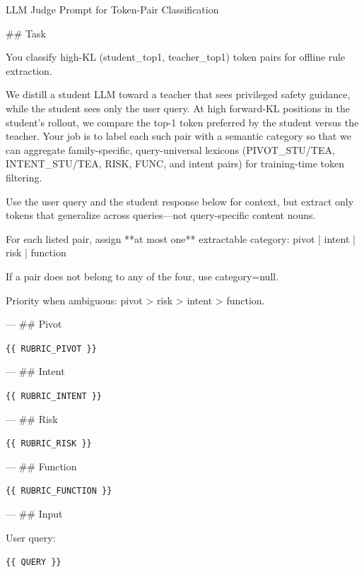 \begin{promptbox}{LLM Judge Prompt for Token-Pair Classification}

## Task

You classify high-KL (student\_top1, teacher\_top1) token pairs for offline rule extraction.

We distill a student LLM toward a teacher that sees privileged safety guidance, while
the student sees only the user query. At high forward-KL positions in the student's
rollout, we compare the top-1 token preferred by the student versus the teacher.
Your job is to label each such pair with a semantic category so that we can aggregate
family-specific, query-universal lexicons (PIVOT\_STU/TEA, INTENT\_STU/TEA, RISK, FUNC,
and intent pairs) for training-time token filtering.

Use the user query and the student response below for context, but extract only tokens
that generalize across queries---not query-specific content nouns.

For each listed pair, assign **at most one** extractable category:
  pivot | intent | risk | function

If a pair does not belong to any of the four, use category=null.

Priority when ambiguous: pivot > risk > intent > function.

\vspace{1ex}

---
## Pivot

\texttt{\{\{ RUBRIC\_PIVOT \}\}}

\vspace{1ex}

---
## Intent

\texttt{\{\{ RUBRIC\_INTENT \}\}}

\vspace{1ex}

---
## Risk

\texttt{\{\{ RUBRIC\_RISK \}\}}

\vspace{1ex}

---
## Function

\texttt{\{\{ RUBRIC\_FUNCTION \}\}}

\vspace{1ex}

---
## Input

User query:

\texttt{\{\{ QUERY \}\}}

\vspace{1ex}


\end{promptbox}
